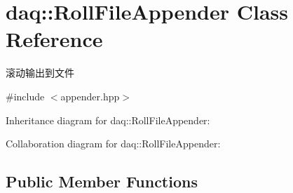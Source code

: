 \hypertarget{classdaq_1_1RollFileAppender}{}\section{daq\+:\+:Roll\+File\+Appender Class Reference}
\label{classdaq_1_1RollFileAppender}


滚动输出到文件  




{\ttfamily \#include $<$appender.\+hpp$>$}



Inheritance diagram for daq\+:\+:Roll\+File\+Appender\+:


Collaboration diagram for daq\+:\+:Roll\+File\+Appender\+:
\subsection*{Public Member Functions}
